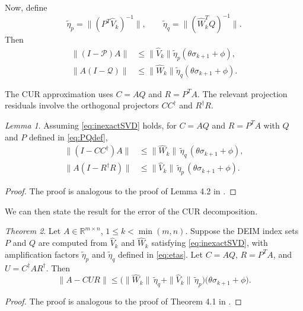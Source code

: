 \documentclass[12pt, a4paper]{article}
\newcommand{\What}{\widehat{W}}
\newcommand{\Vhat}{\widehat{V}}
\newcommand{\E}{\theta}
\newcommand{\F}{\phi}
\def\norm#1{\|#1\|}
\theoremstyle{remark}
\newtheorem{theorem}{Theorem}[section]
\newtheorem{lemma}[theorem]{Lemma}
\begin{document}
Now, define
\begin{equation}
    \tilde{\eta}_p = \norm{(P^T\Vhat_k)^{-1}}, \qquad 
    \tilde{\eta}_q = \norm{(\What_k^T Q)^{-1}}.
    \label{eq:etas}
\end{equation}
Then 
\begin{align}
    \norm{(I-\mathcal{P})A} & \leq \norm{\Vhat_k}\tilde{\eta}_p(\E\sigma_{k+1}+\F),\\
    \norm{A(I-\mathcal{Q})} &\leq \norm{\What_k}\tilde{\eta}_q (\E\sigma_{k+1}+\F).
\end{align}

The CUR approximation uses $C = AQ$ and $R = P^T A$.
The relevant projection residuals involve the orthogonal projectors
$CC^\dagger$ and $R^\dagger R$.
\begin{lemma}
\label{lem:CR}
Assuming \eqref{eq:inexactSVD} holds, for $C = AQ$ and $R = P^T A$ with $Q$ and $P$ defined in \eqref{eq:PQdef},
\begin{align}
  \norm{(I - CC^\dagger)A} &\leq \norm{\What_k}\,\tilde\eta_q\,(\E\sigma_{k+1}+\F),
  \label{eq:C_res} \\
  \norm{A(I - R^\dagger R)} &\leq \norm{\Vhat_k}\,\tilde\eta_p\,(\E\sigma_{k+1}+\F).
  \label{eq:R_res}
\end{align}
\end{lemma}

\begin{proof}
The proof is analogous to the proof of Lemma 4.2 in \cite{sorensen2016deim}.
\end{proof}

We can then state the result for the error of the CUR decomposition. 
\begin{theorem}
\label{thm:main}
Let $A \in \mathbb{R}^{m\times n}$, $1 \le k < \min(m,n)$.  Suppose the DEIM index
sets $P$ and $Q$ are computed from $\Vhat_k$ and $\What_k$
satisfying \eqref{eq:inexactSVD}, with amplification factors
$\tilde\eta_p$ and $\tilde\eta_q$ defined in \eqref{eq:etas}.  Let $C = AQ$, $R = P^T A$, and
$U = C^\dagger A R^\dagger$.  Then
\begin{equation}
  \norm{A - CUR}
  \leq
  \bigl(\norm{\What_k}\,\tilde\eta_q + \norm{\Vhat_k}\,\tilde\eta_p\bigr)
  \bigl(\E\sigma_{k+1} + \F\bigr).
  \label{eq:main}
\end{equation} 
\end{theorem}
\begin{proof}
    The proof is analogous to the proof of Theorem 4.1 in \cite{sorensen2016deim}.
\end{proof}
\end{document}
